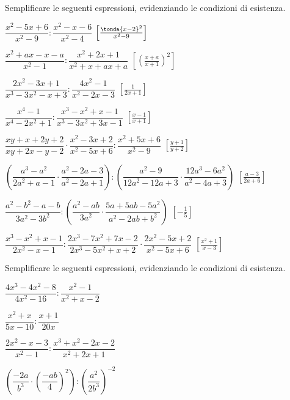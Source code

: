 \begin{esercizio}[\Ast]
\label{ese:19.19}
Semplificare le seguenti espressioni, evidenziando le condizioni di esistenza.
\begin{enumeratea}
 \item \(\dfrac{x^{2}-5x+6}{x^{2}-9}:\dfrac{x^{2}-x-6}{x^{2}-4}\)
  \hfill \(\left[\frac{\tonda{x-2}^2}{x^2-9}\right]\)
 \item \(\dfrac{x^{2}+ax-x-a}{x^{2}-1}:\dfrac{x^{2}+2x+1}{x^{2}+x+ax+a}\)
  \hfill \(\left[\left(\frac{x+a}{x+1}\right)^{2}\right]\)
 \item \(\dfrac{2x^{2}-3x+1}{x^{3}-3x^{2}-x+3}:\dfrac{4x^{2}-1}{x^{2}-2x-3}\)
  \hfill \(\left[\frac{1}{2x+1}\right]\)
 \item \(\dfrac{x^{4}-1}{x^{4}-2x^{2}+1}:
        \dfrac{x^{3}-x^{2}+x-1}{x^{3}-3x^{2}+3x-1}\)
  \hfill \(\left[\frac{x-1}{x+1}\right]\)
 \item \(\dfrac{xy+x+2y+2}{xy+2x-y-2}\cdot
 \dfrac{x^{2}-3x+2}{x^{2}-5x+6}:\dfrac{x^{2}+5x+6}{x^{2}-9}\)
  \hfill \(\left[\frac{y+1}{y+2}\right]\)
 \item \(\left(\dfrac{a^{3}-a^{2}}{2a^{2}+a-1}\cdot
 \dfrac{a^{2}-2a-3}{a^{2}-2a+1}\right):
 \left(\dfrac{a^{2}-9}{12a^{2}-12a+3}\cdot
 \dfrac{12a^{3}-6a^{2}}{a^{2}-4a+3}\right)\)
  \hfill \(\left[\frac{a-3}{2a+6}\right]\)
 \item \(\dfrac{a^{2}-b^{2}-a-b}{3a^{2}-3b^{2}}:
 \left(\dfrac{a^{2}-ab}{3a^{2}}\cdot
 \dfrac{5a+5ab-5a^{2}}{a^{2}-2ab+b^{2}}\right)\)
  \hfill \(\left[-{\frac{1}{5}}\right]\)
 \item \(\dfrac{x^{3}-x^{2}+x-1}{2x^{2}-x-1}:
 \dfrac{2x^{3}-7x^{2}+7x-2}{2x^{3}-5x^{2}+x+2}\cdot
 \dfrac{2x^{2}-5x+2}{x^{2}-5x+6}\)
  \hfill \(\left[\frac{x^{2}+1}{x-3}\right]\)
\end{enumeratea}
\end{esercizio}

\begin{esercizio}
\label{ese:19.21}
Semplificare le seguenti espressioni, evidenziando le condizioni di esistenza.
\begin{multicols}{2}
\begin{enumeratea}
 \item \(\dfrac{4x^{3}-4x^{2}-8}{4x^{2}-16}:\dfrac{x^{2}-1}{x^{2}+x-2}\)
 \item \(\dfrac{x^{2}+x}{5x-10}:\dfrac{x+1}{20x}\)
 \item \(\dfrac{2x^{2}-x-3}{x^{2}-1}:\dfrac{x^{3}+x^{2}-2x-2}{x^{2}+2x+1}\)
 \item \(\left(\dfrac{-{2a}}{b^{3}}\cdot
        \left(\dfrac{-{ab}}{4}\right)^{2}\right):
        \left(\dfrac{a^{2}}{2b^{3}}\right)^{-2}\)%
\end{enumeratea}
\end{multicols}
\end{esercizio}


